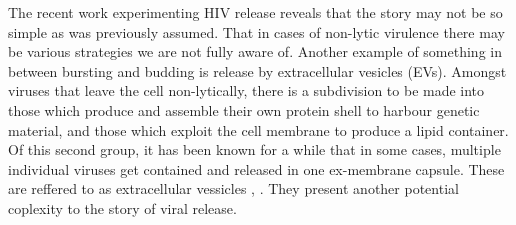 The recent work experimenting HIV release reveals that the story may not be so simple as was previously assumed. That in cases of non-lytic virulence there may be various strategies we are not fully aware of. Another example of something in between bursting and budding is release by extracellular vesicles (EVs). Amongst viruses that leave the cell non-lytically, there is a subdivision to be made into those which produce and assemble their own protein shell to harbour genetic material, and those which exploit the cell membrane to produce a lipid container. Of this second group, it has been known for a while that in some cases, multiple individual viruses get contained and released in one ex-membrane capsule. These are reffered to as extracellular vessicles \cite{kerviel2021new}, \cite{buzas2023roles}. They present another potential coplexity to the story of viral release.
